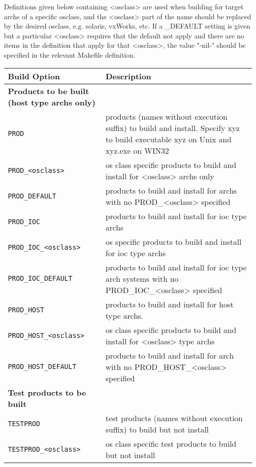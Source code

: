 Definitions given below containing \textless{}osclass\textgreater{} are used when building for target archs of a specific osclass, and the 
\textless{}osclass\textgreater{} part of the name should be replaced by the desired osclass, e.g. solaris, vxWorks, etc. If a \_DEFAULT setting is 
given but a particular \textless{}osclass\textgreater{} requires that the default not apply and there are no items in the definition that apply for 
that \textless{}osclass\textgreater{}, the value "-nil-" should be specified in the relevant Makefile definition.
\begin{center}\begin{longtable}{p{2.94784in}p{3.76247in}}
\textbf{Build Option} & \textbf{Description}\\
\hline
\textbf{Products to be built (host type archs only)} & \\
\verb|PROD| & products (names without execution suffix) to build and install. Specify xyz to build executable xyz on Unix and xyz.exe on WIN32\\
\verb|PROD_<osclass>| & os class specific products to build and install for \textless{}osclass\textgreater{} archs only\\
\verb|PROD_DEFAULT| & products to build and install for archs with no PROD\_\textless{}osclass\textgreater{} specified\\
\verb|PROD_IOC| & products to build and install for ioc type archs\\
\verb|PROD_IOC_<osclass>| & os specific products to build and install for ioc type archs\\
\verb|PROD_IOC_DEFAULT| & products to build and install for ioc type arch systems with no PROD\_IOC\_\textless{}osclass\textgreater{} specified\\
\verb|PROD_HOST| & products to build and install for host type archs. \\
\verb|PROD_HOST_<osclass>| & os class specific products to build and install for \textless{}osclass\textgreater{} type archs\\
\verb|PROD_HOST_DEFAULT| & products to build and install for arch with no PROD\_HOST\_\textless{}osclass\textgreater{} specified\\
\textbf{Test products to be built} & \\
\verb|TESTPROD| & test products (names without execution suffix) to build but not install \\
\verb|TESTPROD_<osclass>| & os class specific test products to build but not install\\

\end{longtable}
\end{center}
